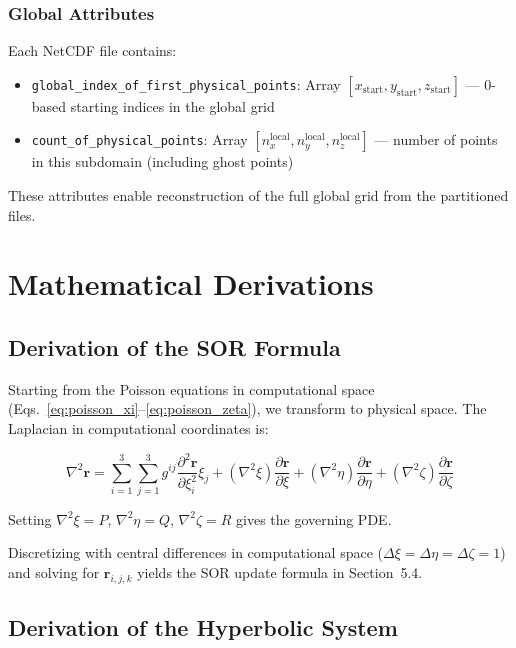 \documentclass[11pt,a4paper]{report}
\newcommand{\pd}[2]{\frac{\partial #1}{\partial #2}}
\newcommand{\pdd}[2]{\frac{\partial^2 #1}{\partial #2^2}}
\newcommand{\rvec}{\bm{r}}
\begin{document}
\subsection{Global Attributes}

Each NetCDF file contains:

\begin{itemize}
    \item \texttt{global\_index\_of\_first\_physical\_points}: Array $[x_{\text{start}}, y_{\text{start}}, z_{\text{start}}]$ --- 0-based starting indices in the global grid
    \item \texttt{count\_of\_physical\_points}: Array $[n_x^{\text{local}}, n_y^{\text{local}}, n_z^{\text{local}}]$ --- number of points in this subdomain (including ghost points)
\end{itemize}

These attributes enable reconstruction of the full global grid from the partitioned files.

\chapter{Mathematical Derivations}

\section{Derivation of the SOR Formula}

Starting from the Poisson equations in computational space (Eqs.~\ref{eq:poisson_xi}--\ref{eq:poisson_zeta}), we transform to physical space. The Laplacian in computational coordinates is:

\begin{equation}
    \nabla^2 \rvec = \sum_{i=1}^{3} \sum_{j=1}^{3} g^{ij} \pdd{\rvec}{\xi_i}{\xi_j} + (\nabla^2 \xi) \pd{\rvec}{\xi} + (\nabla^2 \eta) \pd{\rvec}{\eta} + (\nabla^2 \zeta) \pd{\rvec}{\zeta}
\end{equation}

Setting $\nabla^2 \xi = P$, $\nabla^2 \eta = Q$, $\nabla^2 \zeta = R$ gives the governing PDE.

Discretizing with central differences in computational space ($\Delta\xi = \Delta\eta = \Delta\zeta = 1$) and solving for $\rvec_{i,j,k}$ yields the SOR update formula in Section~5.4.

\section{Derivation of the Hyperbolic System}
\end{document}
